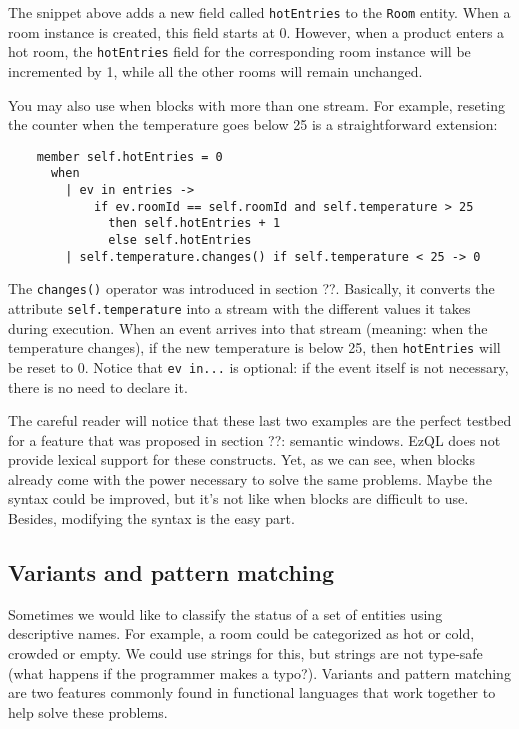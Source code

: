 \documentclass[a4,11pt]{report}
\begin{document}
The snippet above adds a new field called \verb=hotEntries= to the
\verb=Room= entity. When a room instance is created, this field starts
at 0. However, when a product enters a hot room, the \verb=hotEntries=
field for the corresponding room instance will be incremented by 1,
while all the other rooms will remain unchanged.

You may also use when blocks with more than one stream. For example,
reseting the counter when the temperature goes below 25 is a
straightforward extension:

\begin{lstlisting}
    member self.hotEntries = 0
      when
        | ev in entries ->
            if ev.roomId == self.roomId and self.temperature > 25
              then self.hotEntries + 1
              else self.hotEntries
        | self.temperature.changes() if self.temperature < 25 -> 0
\end{lstlisting}

The \verb=changes()= operator was introduced in section ??. Basically,
it converts the attribute \verb=self.temperature= into a stream with
the different values it takes during execution. When an event arrives
into that stream (meaning: when the temperature changes), if the new
temperature is below 25, then \verb=hotEntries= will be reset to
0. Notice that \verb=ev in...= is optional: if the event itself is not
necessary, there is no need to declare it.

The careful reader will notice that these last two examples are the
perfect testbed for a feature that was proposed in section ??:
semantic windows. EzQL does not provide lexical support for these
constructs. Yet, as we can see, when blocks already come with the
power necessary to solve the same problems. Maybe the syntax could be
improved, but it's not like when blocks are difficult to use. Besides,
modifying the syntax is the easy part.

\subsection{Variants and pattern matching}

Sometimes we would like to classify the status of a set of entities
using descriptive names. For example, a room could be categorized as
hot or cold, crowded or empty. We could use strings for this, but
strings are not type-safe (what happens if the programmer makes a
typo?). Variants and pattern matching are two features commonly found
in functional languages that work together to help solve these
problems.
\end{document}
